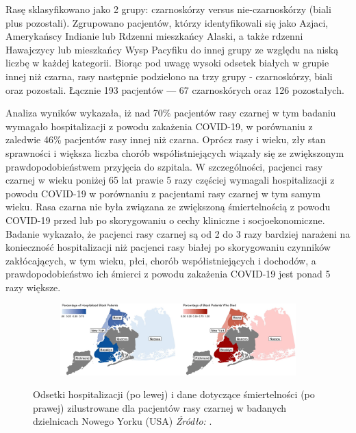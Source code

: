 \documentclass[polish, twoside, 12pt, a4paper]{article}
\theoremstyle{definition}
\theoremstyle{plain}
\theoremstyle{remark}
\begin{document}
Rasę sklasyfikowano jako 2 grupy: czarnoskórzy versus nie-czarnoskórzy (biali plus pozostali). Zgrupowano pacjentów, którzy identyfikowali się jako Azjaci, Amerykańscy Indianie lub Rdzenni mieszkańcy Alaski, a także rdzenni Hawajczycy lub mieszkańcy Wysp Pacyfiku do innej grupy ze względu na niską liczbę w każdej kategorii. Biorąc pod uwagę wysoki odsetek białych w grupie innej niż czarna, rasy następnie podzielono na trzy grupy - czarnoskórzy, biali oraz pozostali. Łącznie 193 pacjentów --- 67 czarnoskórych oraz 126 pozostałych.
	
Analiza wyników wykazała, iż nad 70\% pacjentów rasy czarnej w tym badaniu wymagało hospitalizacji z powodu zakażenia COVID-19, w porównaniu z zaledwie 46\% pacjentów rasy innej niż czarna. Oprócz rasy i wieku, zły stan sprawności i większa liczba chorób współistniejących wiązały się ze zwiększonym prawdopodobieństwem przyjęcia do szpitala. W szczególności, pacjenci rasy czarnej w wieku poniżej 65 lat prawie 5 razy częściej wymagali hospitalizacji z powodu COVID-19 w porównaniu z pacjentami rasy czarnej w tym samym wieku. Rasa czarna nie była związana ze zwiększoną śmiertelnością z powodu COVID-19 przed lub po skorygowaniu o cechy kliniczne i socjoekonomiczne. Badanie wykazało, że pacjenci rasy czarnej są od 2 do 3 razy bardziej narażeni na konieczność hospitalizacji niż pacjenci rasy białej po skorygowaniu czynników zakłócających, w tym wieku, płci, chorób współistniejących i dochodów, a prawdopodobieństwo ich śmierci z powodu zakażenia COVID-19 jest ponad 5 razy większe.


\begin{figure}[H]
  \centering

  \begin{subfigure}[t]{\textwidth}
    \includegraphics[width=15cm]{NY-racial-disparities.jpg}
  \end{subfigure}

  \captionsetup{margin=10pt,font=small,labelfont=bf,width=.8\textwidth}

  \caption{Odsetki hospitalizacji (po lewej) i dane dotyczące śmiertelności (po prawej) zilustrowane dla pacjentów rasy czarnej w badanych dzielnicach Nowego Yorku (USA) \textit{Źródło:} \cite{borghesi2020}.}\label{fig:xxx1}
\end{figure}
\end{document}
